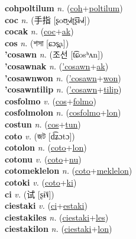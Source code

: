 \textbf{cohpoltilum} \textit{n.} (\hyperref[coh]{coh}+\hyperref[poltilum]{poltilum})
 \label{cohpoltilum} \\
\textbf{coc} \textit{n.} ({\chinese{}手指} [ʂoʊ̯˧˩˧ʈ͡ʂɨ˧˩˧])
 \label{coc} \\
\textbf{cocak} \textit{n.} (\hyperref[coc]{coc}+\hyperref[ak]{ak})
 \label{cocak} \\
\textbf{cos} \textit{n.} ({\bengali{}শসা} [ɕɔs̪a])
 \label{cos} \\
\textbf{'cosawn} \textit{n.} ({\korean{}조선} [t͡ɕosʰʌn])
 \label{'cosawn} \\
\textbf{'cosawnak} \textit{n.} (\hyperref['cosawn]{'cosawn}+\hyperref[ak]{ak})
 \label{'cosawnak} \\
\textbf{'cosawnwon} \textit{n.} (\hyperref['cosawn]{'cosawn}+\hyperref[won]{won})
 \label{'cosawnwon} \\
\textbf{'cosawntilip} \textit{n.} (\hyperref['cosawn]{'cosawn}+\hyperref[tilip]{tilip})
 \label{'cosawntilip} \\
\textbf{cosfolmo} \textit{v.} (\hyperref[cos]{cos}+\hyperref[folmo]{folmo})
 \label{cosfolmo} \\
\textbf{cosfolmolon} \textit{n.} (\hyperref[cosfolmo]{cosfolmo}+\hyperref[lon]{lon})
 \label{cosfolmolon} \\
\textbf{costun} \textit{n.} (\hyperref[cos]{cos}+\hyperref[tun]{tun})
 \label{costun} \\
\textbf{coto} \textit{v.} ({\bengali{}জট} [d͡ʑɔtɔ])
 \label{coto} \\
\textbf{cotolon} \textit{n.} (\hyperref[coto]{coto}+\hyperref[lon]{lon})
 \label{cotolon} \\
\textbf{cotonu} \textit{v.} (\hyperref[coto]{coto}+\hyperref[nu]{nu})
 \label{cotonu} \\
\textbf{cotomeklelon} \textit{n.} (\hyperref[coto]{coto}+\hyperref[meklelon]{meklelon})
 \label{cotomeklelon} \\
\textbf{cotoki} \textit{v.} (\hyperref[coto]{coto}+\hyperref[ki]{ki})
 \label{cotoki} \\
\textbf{ci} \textit{v.} ({\chinese{}试} [ʂɨ˥˩])
 \label{ci} \\
\textbf{ciestaki} \textit{v.} (\hyperref[ci]{ci}+\hyperref[estaki]{estaki})
 \label{ciestaki} \\
\textbf{ciestakiles} \textit{n.} (\hyperref[ciestaki]{ciestaki}+\hyperref[les]{les})
 \label{ciestakiles} \\
\textbf{ciestakilon} \textit{n.} (\hyperref[ciestaki]{ciestaki}+\hyperref[lon]{lon})
 \label{ciestakilon} \\
